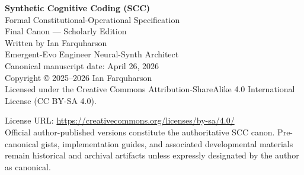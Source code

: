 \documentclass[10pt,oneside]{article}
\theoremstyle{definition}
\theoremstyle{remark}
\begin{document}
\begin{titlepage}
\centering
{\Huge\bfseries Synthetic Cognitive Coding (SCC)\\[0.35em]}
{\LARGE Formal Constitutional-Operational Specification\\[0.25em]}
{\Large Final Canon --- Scholarly Edition\\[1.15em]}
{\large Written by Ian Farquharson}\\[0.25em]
{\normalsize Emergent-Evo Engineer \textbar{} Neural-Synth Architect}\\[1.25em]

\vfill
{\large Canonical manuscript date: April 26, 2026}\\[1em]
{\normalsize Copyright \copyright{} 2025--2026 Ian Farquharson}\\[0.5em]
{\normalsize Licensed under the Creative Commons Attribution-ShareAlike 4.0 International License (CC BY-SA 4.0).}\par
{\normalsize License URL: \url{https://creativecommons.org/licenses/by-sa/4.0/}}\\[1em]
{\small Official author-published versions constitute the authoritative SCC canon. Pre-canonical gists, implementation guides, and associated developmental materials remain historical and archival artifacts unless expressly designated by the author as canonical.}
\end{titlepage}

\end{document}
